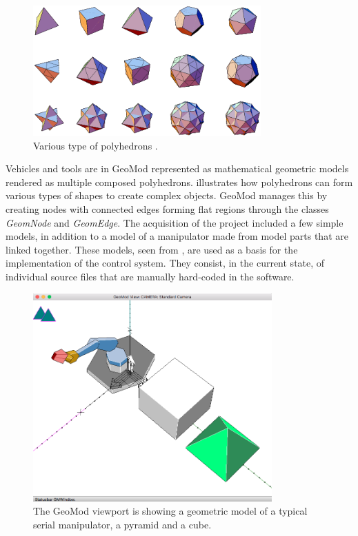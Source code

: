 \begin{figure}[ht]
    \centering
    \includegraphics[height=5cm]{images/poly.png}
    \caption[Various type of polyhedrons \cite{polyhedrons}]{Various type of polyhedrons \cite{polyhedrons}.}
    \label{fig:polyhedrons}
\end{figure}

\noindent Vehicles and tools are in GeoMod represented as mathematical geometric models rendered as multiple composed polyhedrons.  illustrates how polyhedrons can form various types of shapes to create complex objects. GeoMod manages this by creating nodes with connected edges forming flat regions through the classes \textit{GeomNode} and \textit{GeomEdge}. The acquisition of the project included a few simple models, in addition to a model of a manipulator made from model parts that are linked together. These models, seen from , are used as a basis for the implementation of the control system. They consist, in the current state, of individual source files that are manually hard-coded in the software. 

\begin{figure}[ht]
    \centering
    \includegraphics[height=8cm]{images/Models.png}
    \caption[The GeoMod viewport is showing a geometric model of a typical serial manipulator,a pyramid and a cube]{The GeoMod viewport is showing a geometric model of a typical serial manipulator, a pyramid and a cube.}
    \label{fig:viewport}
\end{figure}

